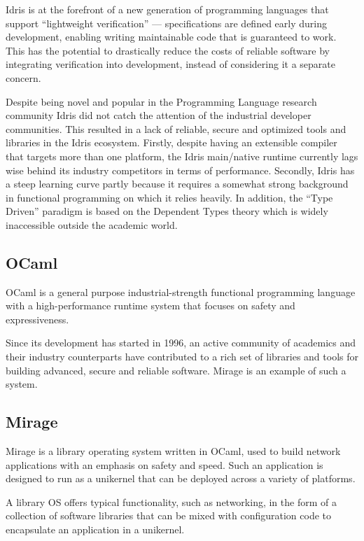 \documentclass[a4paper]{report}
\begin{document}
Idris is at the forefront of a new generation of programming languages
that support “lightweight verification” --- specifications are defined
early during development, enabling writing maintainable code that is
guaranteed to work.
This has the potential to drastically reduce the costs of reliable software by
integrating verification into development, instead of considering it a separate
concern.

Despite being novel and popular in the Programming Language research community
Idris did not catch the attention of the industrial developer communities.
This resulted in a lack of reliable, secure and optimized tools and libraries
in the Idris ecosystem.
Firstly, despite having an extensible compiler that targets more than one
platform, the Idris main/native runtime currently lags wise behind
its industry competitors in terms of performance.
Secondly, Idris has a steep learning curve partly because it requires
a somewhat strong background in functional programming on which it relies
heavily.
In addition, the ``Type Driven'' paradigm is based on the Dependent Types
theory which is widely inaccessible outside the academic world.

\subsection{OCaml}
OCaml is a general purpose industrial-strength functional programming language
with a high-performance runtime system that focuses on safety and
expressiveness.

Since its development has started in 1996, an active community of
academics and their industry counterparts have contributed to a rich set of
libraries and tools for building advanced, secure and reliable software. Mirage
is an example of such a system.

\subsection{Mirage}
Mirage is a library operating system written in OCaml, used to build network
applications with an emphasis on safety and speed.
Such an application is designed to run as a unikernel that can be deployed
across a variety of platforms.

A library OS offers typical functionality, such as networking,
in the form of a collection of software libraries that can be mixed with
configuration code to encapsulate an application in a unikernel.
\end{document}
